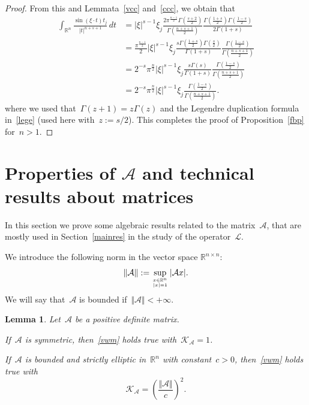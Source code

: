 \documentclass[11pt,hyp,]{nyjm}
\numberwithin{equation}{section}
\newcommand{\R}{\mathbb{R}}
\newtheorem{lemma}[theorem]{Lemma}
\theoremstyle{remark}
\newcommand{\am}{\mathcal{A}}
\begin{document}
\begin{proof}
{F}rom this and Lemmata~\ref{vcc} and~\ref{ccc}, we obtain that
\begin{equation*}\begin{split}
\int_{\R^n} \frac{\sin(\xi \cdot t) t_j}{|t|^{n+s+1}} \, dt &= 
|\xi|^{s-1}\xi_j
\frac{2 \pi^{\frac{n-1}{2}}\Gamma\left(\frac{s+2}{2}\right)}{\Gamma\left(\frac{n+s+1}{2}\right)}  \frac{\Gamma(\frac{1+s}{2})\Gamma(\frac{1-s}{2})}{2\Gamma(1+s)}
\\ &=\frac{ \pi^{\frac{n-1}{2}}}{2} |\xi|^{s-1}\xi_j \frac{s \Gamma(\frac{1+s}{2})\Gamma\left(\frac{s}{2}\right)}{\Gamma(1+s)}  \frac{\Gamma(\frac{1-s}{2})}{\Gamma\left(\frac{n+s+1}{2}\right)}\\&=2^{-s}\pi^{\frac{n}{2}}|\xi|^{s-1}\xi_j \frac{ s\Gamma(s)}{\Gamma(1+s)}  \frac{\Gamma(\frac{1-s}{2})}{\Gamma\left(\frac{n+s+1}{2}\right)} \\&= 2^{-s}\pi^{\frac{n}{2}}|\xi|^{s-1}\xi_j \frac{\Gamma(\frac{1-s}{2})}{\Gamma\left(\frac{n+s+1}{2}\right)}.
\end{split}\end{equation*}
where we used that~$\Gamma(z+1)= z \Gamma(z)$ and the
Legendre duplication formula in~\eqref{lege} (used here with~$z:= s/2$).
This completes the proof of Proposition~\ref{fbp} for~$n>1$.
\end{proof}

\section{Properties of $\mathcal{A}$ and technical results about matrices}\label{fappend}

In this section we prove some algebraic results related to the matrix~$\mathcal{A}$, that are mostly used in Section~\ref{mainres} in the study of the operator~$\mathcal{L}$.

{W}e introduce the following norm in the vector space $\mathbb{R}^{n \times n}$: 
			\begin{equation*}%
				\Vert \am \Vert := \sup_{{x\in\R^n}\atop{|x|=1}}|\am x |.
			\end{equation*} 
We will say that~$\mathcal{A}$ is bounded if~$\Vert \am \Vert <+\infty$.
			
	\begin{lemma}\label{lemon}
	Let~$\mathcal{A}$ be a positive definite matrix.
	
	If~$\mathcal{A}$ is symmetric, then~\eqref{vwm} holds true with~$\mathcal{K}_{\am} = 1$.
	
If~$\mathcal{A}$ is bounded and strictly elliptic in~$\R^n$ with constant~$c>0$, then~\eqref{vwm} holds true with
$$\mathcal{K}_{\am} = \left(\frac{\Vert \mathcal{A} \Vert}{ c}\right)^2.$$	
	\end{lemma}
	
\end{document}
